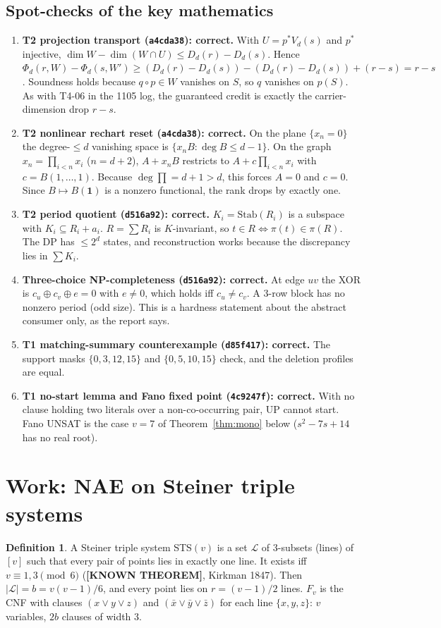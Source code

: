\documentclass[11pt]{article}
\theoremstyle{definition}
\newtheorem{definition}{Definition}
\theoremstyle{remark}
\newcommand{\lab}[1]{\textbf{[#1]}}
\begin{document}
\subsection{Spot-checks of the key mathematics}\label{sec:spot}
\begin{enumerate}
\item \textbf{T2 projection transport (\texttt{a4cda38}): correct.} With $U=p^*V_d(s)$ and
$p^*$ injective, $\dim W-\dim(W\cap U)\le D_d(r)-D_d(s)$. Hence
$\Phi_d(r,W)-\Phi_d(s,W')\ge (D_d(r)-D_d(s))-(D_d(r)-D_d(s))+(r-s)=r-s$. Soundness holds
because $q\circ p\in W$ vanishes on $S$, so $q$ vanishes on $p(S)$. As with T4-06 in the
1105 log, the guaranteed credit is exactly the carrier-dimension drop $r-s$.
\item \textbf{T2 nonlinear rechart reset (\texttt{a4cda38}): correct.} On the plane
$\{x_n=0\}$ the degree-$\le d$ vanishing space is $\{x_nB:\deg B\le d-1\}$. On the graph
$x_n=\prod_{i<n}x_i$ ($n=d+2$), $A+x_nB$ restricts to $A+c\prod_{i<n}x_i$ with
$c=B(1,\dots,1)$. Because $\deg\prod=d+1>d$, this forces $A=0$ and $c=0$. Since
$B\mapsto B(\mathbf1)$ is a nonzero functional, the rank drops by exactly one.
\item \textbf{T2 period quotient (\texttt{d516a92}): correct.} $K_i=\mathrm{Stab}(R_i)$
is a subspace with $K_i\subseteq R_i+a_i$. $R=\sum R_i$ is $K$-invariant, so
$t\in R\iff\pi(t)\in\pi(R)$. The DP has $\le2^d$ states, and reconstruction works because
the discrepancy lies in $\sum K_i$.
\item \textbf{Three-choice NP-completeness (\texttt{d516a92}): correct.} At edge $uv$ the
XOR is $c_u\oplus c_v\oplus e=0$ with $e\ne0$, which holds iff $c_u\ne c_v$. A 3-row block
has no nonzero period (odd size). This is a hardness statement about the abstract consumer
only, as the report says.
\item \textbf{T1 matching-summary counterexample (\texttt{d85f417}): correct.} The support
masks $\{0,3,12,15\}$ and $\{0,5,10,15\}$ check, and the deletion profiles are equal.
\item \textbf{T1 no-start lemma and Fano fixed point (\texttt{4c9247f}): correct.} With no
clause holding two literals over a non-co-occurring pair, UP cannot start. Fano UNSAT is
the case $v=7$ of Theorem~\ref{thm:mono} below ($s^2-7s+14$ has no real root).
\end{enumerate}

\section{Work: NAE on Steiner triple systems}\label{sec:work}
\begin{definition}
A Steiner triple system STS$(v)$ is a set $\mathcal L$ of 3-subsets (lines) of $[v]$ such
that every pair of points lies in exactly one line. It exists iff $v\equiv1,3\pmod 6$
(\lab{KNOWN THEOREM}, Kirkman 1847). Then $|\mathcal L|=b=v(v-1)/6$, and every point lies
on $r=(v-1)/2$ lines. $F_v$ is the CNF with clauses $(x\vee y\vee z)$ and
$(\bar x\vee\bar y\vee\bar z)$ for each line $\{x,y,z\}$: $v$ variables, $2b$ clauses of
width 3.
\end{definition}
\end{document}
